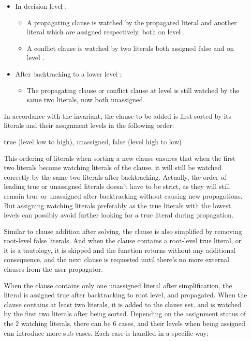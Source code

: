 \begin{itemize}
  \item In decision level :
  \begin{itemize}
    \item A propagating clause is watched by the propagated literal and another literal which are assigned  respectively, both on level .
    \item A conflict clause is watched by two literals both assigned false and on level .
  \end{itemize}
  \item After backtracking to a lower level :
  \begin{itemize}
    \item The propagating clause or conflict clause at level  is still watched by the same two literals, now both unassigned.
  \end{itemize}
\end{itemize}

In accordance with the invariant, the clause to be added is first sorted by its literals and their assignment levels in the following order:

\begin{center}
  true (level low to high), unassigned, false (level high to low)
\end{center}

This ordering of literals when sorting a new clause ensures that when the first two literals become watching literals of the clause, it will still be watched correctly by the same two literals after backtracking. Actually, the order of leading true or unassigned literals doesn't have to be strict, as they will still remain true or unassigned after backtracking without causing new propagations. But assigning watching literals preferably as the true literals with the lowest levels can possibly avoid further looking for a true literal during propagation.

Similar to clause addition after solving, the clause is also simplified by removing root-level false literals. And when the clause contains a root-level true literal, or it is a tautology, it is skipped and the function returns without any additional consequence, and the next clause is requested until there's no more external clauses from the user propagator.

When the clause contains only one unassigned literal after simplification, the literal is assigned true after backtracking to root level, and propagated. When the clause contains at least two literals, it is added to the clause set, and is watched by the first two literals after being sorted. Depending on the assignment status of the 2 watching literals, there can be 6 cases, and their levels when being assigned can introduce more sub-cases. Each case is handled in a specific way:

